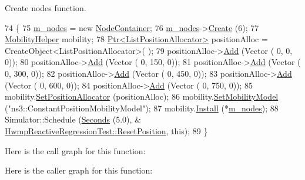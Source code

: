 Create nodes function. 


\begin{DoxyCode}
74 \{
75   \hyperlink{classHwmpReactiveRegressionTest_a2b8250bd4d0555240ec552e57480ae7c}{m\_nodes} = \textcolor{keyword}{new} \hyperlink{classns3_1_1NodeContainer}{NodeContainer};
76   \hyperlink{classHwmpReactiveRegressionTest_a2b8250bd4d0555240ec552e57480ae7c}{m\_nodes}->\hyperlink{classns3_1_1NodeContainer_a787f059e2813e8b951cc6914d11dfe69}{Create} (6);
77   \hyperlink{classns3_1_1MobilityHelper}{MobilityHelper} mobility;
78   \hyperlink{classns3_1_1Ptr}{Ptr<ListPositionAllocator>} positionAlloc = CreateObject<ListPositionAllocator>(
      );
79   positionAlloc->\hyperlink{classns3_1_1ListPositionAllocator_a460e82f015ac012a73ba0ea0cccb3486}{Add} (Vector (  0,   0, 0));
80   positionAlloc->\hyperlink{classns3_1_1ListPositionAllocator_a460e82f015ac012a73ba0ea0cccb3486}{Add} (Vector (  0, 150, 0));
81   positionAlloc->\hyperlink{classns3_1_1ListPositionAllocator_a460e82f015ac012a73ba0ea0cccb3486}{Add} (Vector (  0, 300, 0));
82   positionAlloc->\hyperlink{classns3_1_1ListPositionAllocator_a460e82f015ac012a73ba0ea0cccb3486}{Add} (Vector (  0, 450, 0));
83   positionAlloc->\hyperlink{classns3_1_1ListPositionAllocator_a460e82f015ac012a73ba0ea0cccb3486}{Add} (Vector (  0, 600, 0));
84   positionAlloc->\hyperlink{classns3_1_1ListPositionAllocator_a460e82f015ac012a73ba0ea0cccb3486}{Add} (Vector (  0, 750, 0));
85   mobility.\hyperlink{classns3_1_1MobilityHelper_ac59d5295076be3cc11021566713a28c5}{SetPositionAllocator} (positionAlloc);
86   mobility.\hyperlink{classns3_1_1MobilityHelper_a030275011b6f40682e70534d30280aba}{SetMobilityModel} (\textcolor{stringliteral}{"ns3::ConstantPositionMobilityModel"});
87   mobility.\hyperlink{classns3_1_1MobilityHelper_a07737960ee95c0777109cf2994dd97ae}{Install} (*\hyperlink{classHwmpReactiveRegressionTest_a2b8250bd4d0555240ec552e57480ae7c}{m\_nodes});
88   Simulator::Schedule (\hyperlink{group__timecivil_ga33c34b816f8ff6628e33d5c8e9713b9e}{Seconds} (5.0), &
      \hyperlink{classHwmpReactiveRegressionTest_a4e90c3bf3be7eaf73a9b84d26d6ec0f3}{HwmpReactiveRegressionTest::ResetPosition}, \textcolor{keyword}{this});
89 \}
\end{DoxyCode}


Here is the call graph for this function\+:




Here is the caller graph for this function\+:


